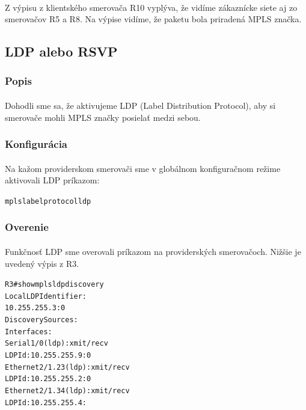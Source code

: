 \documentclass[12pt,twoside,a4paper]{report}
\begin{document}
\paragraph{}
Z výpisu  z klientského smerovača R10 vyplýva, že vidíme zákaznícke siete aj zo smerovačov R5 a R8. Na výpise  vidíme, že paketu bola priradená MPLS značka.




\subsection{LDP alebo RSVP}
\subsubsection{Popis}
\paragraph{}
Dohodli sme sa, že aktivujeme LDP (Label Distribution Protocol), aby si smerovače mohli MPLS značky posielať medzi sebou.

\subsubsection{Konfigurácia}
\paragraph{}
Na kažom providerskom smerovači sme v globálnom konfiguračnom režime aktivovali LDP príkazom:

\noindent
{\selectfont
\begin{small}
\begin{alltt}
mpls label protocol ldp
\end{alltt}
\end{small}
}

\subsubsection{Overenie}
\paragraph{}
Funkčnosť LDP sme overovali príkazom  na providerských smerovačoch. Nižšie je uvedený výpis z R3.

\noindent
{\selectfont
\begin{small}
\begin{alltt}
R3#show mpls ldp discovery
 Local LDP Identifier:
    10.255.255.3:0
    Discovery Sources:
    Interfaces:
	Serial1/0 (ldp): xmit/recv
	    LDP Id: 10.255.255.9:0
	Ethernet2/1.23 (ldp): xmit/recv
	    LDP Id: 10.255.255.2:0
	Ethernet2/1.34 (ldp): xmit/recv
	    LDP Id: 10.255.255.4:
\end{alltt}
\end{small}
}
\end{document}
